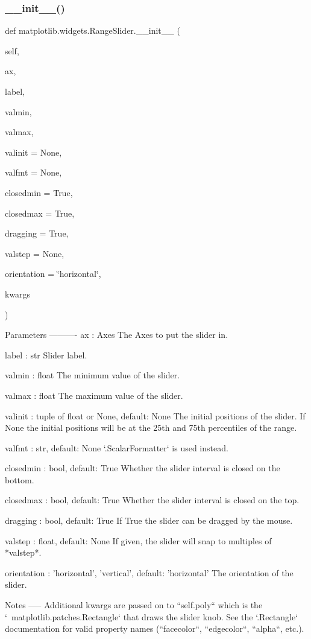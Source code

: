 \subsubsection{\texorpdfstring{\+\_\+\+\_\+init\+\_\+\+\_\+()}{\_\_init\_\_()}}
{\footnotesize\ttfamily def matplotlib.\+widgets.\+Range\+Slider.\+\_\+\+\_\+init\+\_\+\+\_\+ (\begin{DoxyParamCaption}\item[{}]{self,  }\item[{}]{ax,  }\item[{}]{label,  }\item[{}]{valmin,  }\item[{}]{valmax,  }\item[{}]{valinit = {\ttfamily None},  }\item[{}]{valfmt = {\ttfamily None},  }\item[{}]{closedmin = {\ttfamily True},  }\item[{}]{closedmax = {\ttfamily True},  }\item[{}]{dragging = {\ttfamily True},  }\item[{}]{valstep = {\ttfamily None},  }\item[{}]{orientation = {\ttfamily \char`\"{}horizontal\char`\"{}},  }\item[{}]{kwargs }\end{DoxyParamCaption})}

\begin{DoxyVerb}Parameters
----------
ax : Axes
    The Axes to put the slider in.

label : str
    Slider label.

valmin : float
    The minimum value of the slider.

valmax : float
    The maximum value of the slider.

valinit : tuple of float or None, default: None
    The initial positions of the slider. If None the initial positions
    will be at the 25th and 75th percentiles of the range.

valfmt : str, default: None
    `.ScalarFormatter` is used instead.

closedmin : bool, default: True
    Whether the slider interval is closed on the bottom.

closedmax : bool, default: True
    Whether the slider interval is closed on the top.

dragging : bool, default: True
    If True the slider can be dragged by the mouse.

valstep : float, default: None
    If given, the slider will snap to multiples of *valstep*.

orientation : {'horizontal', 'vertical'}, default: 'horizontal'
    The orientation of the slider.

Notes
-----
Additional kwargs are passed on to ``self.poly`` which is the
`~matplotlib.patches.Rectangle` that draws the slider knob.  See the
`.Rectangle` documentation for valid property names (``facecolor``,
``edgecolor``, ``alpha``, etc.).
\end{DoxyVerb}
 

